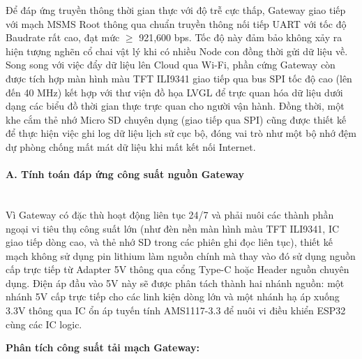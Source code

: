 \documentclass{article} %
\begin{document}
Để đáp ứng truyền thông thời gian thực với độ trễ cực thấp, Gateway giao tiếp với mạch MSMS Root thông qua chuẩn truyền thông nối tiếp UART với tốc độ Baudrate rất cao, đạt mức $\ge$ 921,600 bps. Tốc độ này đảm bảo không xảy ra hiện tượng nghẽn cổ chai vật lý khi có nhiều Node con đồng thời gửi dữ liệu về. Song song với việc đẩy dữ liệu lên Cloud qua Wi-Fi, phần cứng Gateway còn được tích hợp màn hình màu TFT ILI9341 giao tiếp qua bus SPI tốc độ cao (lên đến 40 MHz) kết hợp với thư viện đồ họa LVGL để trực quan hóa dữ liệu dưới dạng các biểu đồ thời gian thực trực quan cho người vận hành. Đồng thời, một khe cắm thẻ nhớ Micro SD chuyên dụng (giao tiếp qua SPI) cũng được thiết kế để thực hiện việc ghi log dữ liệu lịch sử cục bộ, đóng vai trò như một bộ nhớ đệm dự phòng chống mất mát dữ liệu khi mất kết nối Internet. 

\paragraph{A. Tính toán đáp ứng công suất nguồn Gateway} \mbox{}\\
Vì Gateway có đặc thù hoạt động liên tục 24/7 và phải nuôi các thành phần ngoại vi tiêu thụ công suất lớn (như đèn nền màn hình màu TFT ILI9341, IC giao tiếp dòng cao, và thẻ nhớ SD trong các phiên ghi đọc liên tục), thiết kế mạch không sử dụng pin lithium làm nguồn chính mà thay vào đó sử dụng nguồn cấp trực tiếp từ Adapter 5V thông qua cổng Type-C hoặc Header nguồn chuyên dụng. Điện áp đầu vào 5V này sẽ được phân tách thành hai nhánh nguồn: một nhánh 5V cấp trực tiếp cho các linh kiện dòng lớn và một nhánh hạ áp xuống 3.3V thông qua IC ổn áp tuyến tính AMS1117-3.3 để nuôi vi điều khiển ESP32 cùng các IC logic.

\textbf{Phân tích công suất tải mạch Gateway:}
\begin{table}[H]
    \centering
    \caption{Bảng tính toán công suất nguồn định mức mạch Gateway}
    \label{tab:power_peak_gateway}
    \renewcommand{\arraystretch}{1.3}
\end{table}
\end{document}
